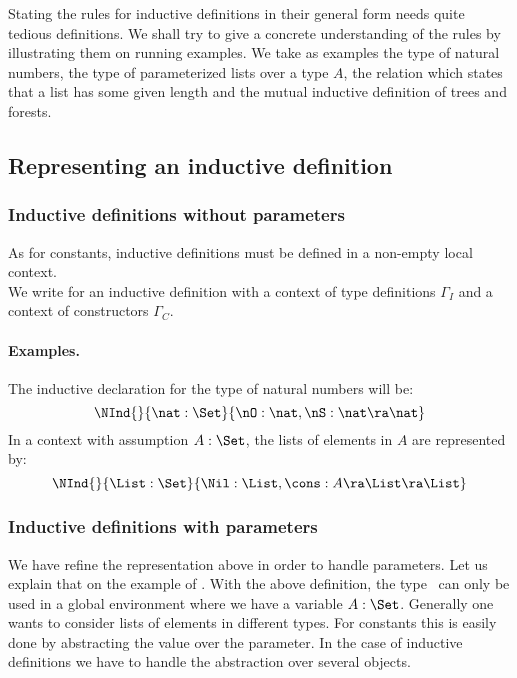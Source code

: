 Stating the rules for inductive definitions in their general form
needs quite tedious definitions. We shall try to give a concrete
understanding of the rules by illustrating them on running examples.  We
take as examples the type of natural numbers, the type of
parameterized lists over a type $A$, the relation which states that
a list has some given length and the mutual inductive definition of trees and
forests. 

\subsection{Representing an inductive definition}
\subsubsection{Inductive definitions without parameters}
As for constants, inductive definitions must be defined in a non-empty
local context. \\
We write  for an inductive
definition with a
context of type definitions $\Gamma_I$ and a context of constructors
$\Gamma_C$.
\paragraph{Examples.}
The inductive declaration for the type of natural numbers will be:
\[\NInd{}{\nat:\Set}{\nO:\nat,\nS:\nat\ra\nat}\]
In a context with assumption $A:\Set$, the lists of elements in $A$ are
represented by:
\[\NInd{}{\List:\Set}{\Nil:\List,\cons : A \ra \List \ra
  \List}\]




\subsubsection{Inductive definitions with parameters}

We have refine the representation above in order to handle parameters. 
Let us explain that on the example of \List. With the above definition,
the type \List\ can only be used in a global environment where we
have a variable $A:\Set$. Generally one wants to consider lists of
elements in different types. For constants this is easily done by abstracting
the value over the parameter. In the case of inductive definitions we
have to handle the abstraction over several objects.

